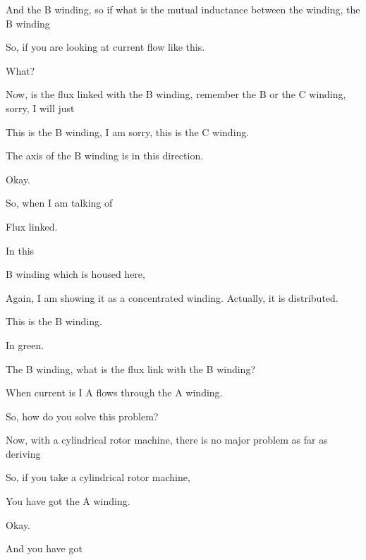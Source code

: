 \documentclass{article}
\begin{document}
And the B winding, so if what is the mutual inductance between the winding, the B winding

So, if you are looking at current flow like this.

What?

Now, is the flux linked with the B winding, remember the B or the C winding, sorry, I will just

This is the B winding, I am sorry, this is the C winding.

The axis of the B winding is in this direction.



Okay.

So, when I am talking of

Flux linked.

In this







B winding which is housed here,

Again, I am showing it as a concentrated winding. Actually, it is distributed.

This is the B winding.

In green.

The B winding, what is the flux link with the B winding?

When current is I A flows through the A winding.

So, how do you solve this problem?

Now, with a cylindrical rotor machine, there is no major problem as far as deriving

So, if you take a cylindrical rotor machine,





You have got the A winding.

Okay.



And you have got

\end{document}
